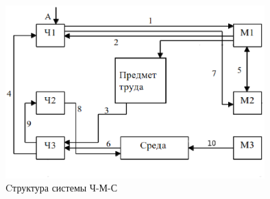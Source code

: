\begin{figure}
    \begin{center}
       \includegraphics[width=100mm]{graphics/worker_safety_HME.eps}
    \end{center}
    \caption{Cтруктура системы Ч-М-С}
    \label{fig:worker_safety_HME}
\end{figure}

